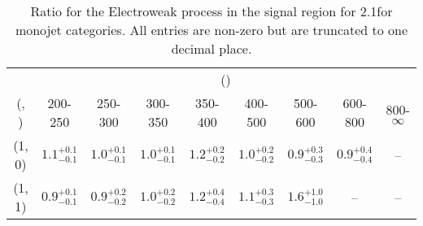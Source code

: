 \begin{table}[h!]
\tiny
\centering
\caption{Ratio for the Electroweak process in the signal region for 2.1\ifb for monojet categories. All entries are non-zero but are truncated to one decimal place.\label{tab:ratiosepnaive_sig_ewk_mono}}
\begin{tabular}
{ccccccccc}
	\hline\hline
	& \multicolumn{8}{c}{\scalht (\gev)} \\ 
	 (\njet,  \nb) & 200-250 & 250-300 & 300-350 & 350-400 & 400-500 & 500-600 & 600-800 & 800-$\infty$ \\ [0.8ex] 
\hline
	(1, 0) & $1.1^{+ 0.1 }_{- 0.1 }$ & $1.0^{+ 0.1 }_{- 0.1 }$ & $1.0^{+ 0.1 }_{- 0.1 }$ & $1.2^{+ 0.2 }_{- 0.2 }$ & $1.0^{+ 0.2 }_{- 0.2 }$ & $0.9^{+ 0.3 }_{- 0.3 }$ & $0.9^{+ 0.4 }_{- 0.4 }$ & -- \\[0.5ex] 
	(1, 1) & $0.9^{+ 0.1 }_{- 0.1 }$ & $0.9^{+ 0.2 }_{- 0.2 }$ & $1.0^{+ 0.2 }_{- 0.2 }$ & $1.2^{+ 0.4 }_{- 0.4 }$ & $1.1^{+ 0.3 }_{- 0.3 }$ & $1.6^{+ 1.0 }_{- 1.0 }$ & -- & -- \\[0.5ex] 
	\hline
	\hline
\end{tabular}
\end{table}

